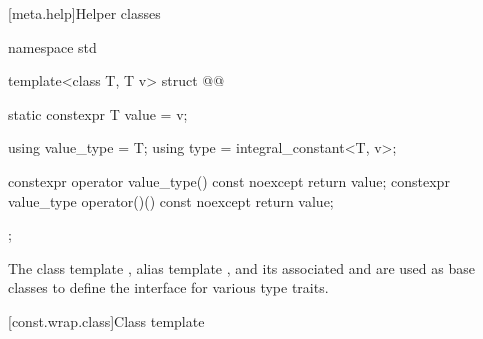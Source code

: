 [meta.help]{Helper classes}

%
\begin{codeblock}
namespace std {
  template<class T, T v> struct @@ {
    static constexpr T value = v;

    using value_type = T;
    using type = integral_constant<T, v>;

    constexpr operator value_type() const noexcept { return value; }
    constexpr value_type operator()() const noexcept { return value; }
  };
}
\end{codeblock}

%
%
%
\pnum
The class template ,
alias template , and
its associated 
 and 
are used as base classes to define
the interface for various type traits.

[const.wrap.class]{Class template }


